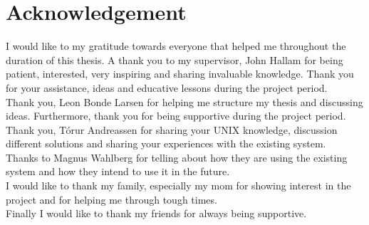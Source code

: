 {\let\clearpage\relax\chapter*{Acknowledgement}}

I would like to my gratitude towards everyone that helped me throughout the duration of this thesis. A thank you to my supervisor, John Hallam for being patient, interested, very inspiring and sharing invaluable knowledge. Thank you for your assistance, ideas and educative lessons during the project period. \\
Thank you, Leon Bonde Larsen for helping me structure my thesis and discussing ideas. Furthermore, thank you for being supportive during the project period.\\
Thank you, Tórur Andreassen for sharing your UNIX knowledge, discussion different solutions and sharing your experiences with the existing system.\\
Thanks to Magnus Wahlberg for telling about how they are using the existing system and how they intend to use it in the future.\\
I would like to thank my family, especially my mom for showing interest in the project and for helping me through tough times.\\

Finally I would like to thank my friends for always being supportive.


